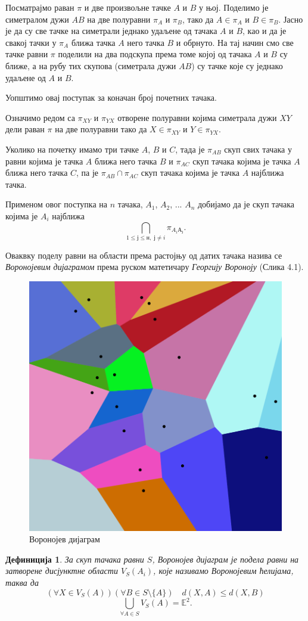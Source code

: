 \documentclass[12pt]{report}
\newtheorem{definition}[theorem]{\bf Дефиниција}
\begin{document}
Посматрајмо раван $\pi$ и две произвољне тачке $A$ и $B$ у њој. Поделимо је симетралом дужи $AB$ на две полуравни $\pi _A$ и $\pi _B$, тако да $A \in \pi _ A$ и $B \in \pi _B$. Јасно је да су све тачке на симетрали једнако удаљене од тачака $A$ и $B$, као и да је свакој тачки у $\pi _A$ ближа тачка $A$ него тачка $B$ и обрнуто. 
На тај начин смо све тачке равни $\pi$ поделили на два подскупа према томе којој од тачака $A$ и $B$ су ближе, а на рубу тих скупова (симетрала дужи $AB$) су тачке које су једнако удаљене од $A$ и $B$.

Уопштимо овај поступак за коначан број почетних тачака.

Означимо редом са $\pi _{XY}$ и $\pi _{YX}$ отворене полуравни којима симетрала дужи $XY$ дели раван $\pi$ на две полуравни тако да $X \in \pi _ {XY}$ и $Y \in \pi _{YX}$. 

Уколико на почетку имамо три тачке $A$, $B$ и $C$, тада је $\pi _{AB}$ скуп свих тачака у равни којима је тачка $A$ ближа него тачка $B$ и $\pi _{AC}$ скуп тачака којима је тачка $A$ ближа него тачка $C$, па је $\pi _{AB} \cap \pi _{AC}$ скуп тачака којима је тачка $A$ најближа тачка.

Применом овог поступка на  $n$ тачака, $A_1$, $A_2$, ... $A_n$ добијамо да је скуп тачака којима је $A_i$ најближа   $$\bigcap _{1\leq ј\leq н,\; ј\neq i} \pi_{A_i А_ј}.$$

Оваквку поделу равни на области према растојњу од датих тачака назива се \emph{Воронојевим дијаграмом} према руском матетичару \emph{Георгију Вороноју} (Слика 4.1).

\begin{figure}
    \centering
    \includegraphics[width=.4\textwidth]{voronoiiii.png}
    \caption{Воронојев дијаграм}
    \label{fig:my_label}
\end{figure}

\begin{definition}%
За скуп тачака равни $S$, Воронојев дијаграм је подела равни на затворене дисјунктне области $V_S(A_i)$, које називамо Воронојевим  ћелијама, таква да
$$ (\forall X \in V_{S}(A))(\forall B \in S\setminus \{A\})\quad d(X,A)\leq d(X,B) $$
$$ \bigcup_{\forall A \in S} V_{S}(A) = \mathbb{E}^2 .$$

\end{definition}
\end{document}
